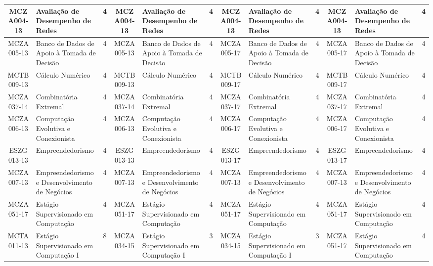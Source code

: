 \begin{landscape}
{\begin{longtable}{|c|p{.2\textheight}|c||c|p{.2\textheight}|c||c|p{.2\textheight}|c||c|p{.2\textheight}|c|}
MCZA004-13 & Avaliação de Desempenho de Redes & 4 &
MCZA004-13 & Avaliação de Desempenho de Redes & 4 &
MCZA004-13 & Avaliação de Desempenho de Redes & 4 &
MCZA004-13 & Avaliação de Desempenho de Redes & 4\\ \hline

MCZA005-13 & Banco de Dados de Apoio à Tomada de Decisão & 4 &
MCZA005-13 & Banco de Dados de Apoio à Tomada de Decisão & 4 &
MCZA005-17 & Banco de Dados de Apoio à Tomada de Decisão & 4 &
MCZA005-17 & Banco de Dados de Apoio à Tomada de Decisão & 4\\ \hline

MCTB009-13 & Cálculo Numérico & 4 &
MCTB009-13 & Cálculo Numérico & 4 &
MCTB009-17 & Cálculo Numérico & 4 &
MCTB009-17 & Cálculo Numérico & 4\\ \hline

MCZA037-14 & Combinatória Extremal & 4 &
MCZA037-14 & Combinatória Extremal & 4 &
MCZA037-17 & Combinatória Extremal & 4 &
MCZA037-17 & Combinatória Extremal & 4\\ \hline

MCZA006-13 & Computação Evolutiva e Conexionista & 4 &
MCZA006-13 & Computação Evolutiva e Conexionista & 4 &
MCZA006-17 & Computação Evolutiva e Conexionista & 4 &
MCZA006-17 & Computação Evolutiva e Conexionista & 4\\ \hline

ESZG013-13 & Empreendedorismo & 4 &
ESZG013-13 & Empreendedorismo & 4 &
ESZG013-17 & Empreendedorismo & 4 &
ESZG013-17 & Empreendedorismo & 4\\ \hline

MCZA007-13 & Empreendedorismo e Desenvolvimento de Negócios & 4 &
MCZA007-13 & Empreendedorismo e Desenvolvimento de Negócios & 4 &
MCZA007-13 & Empreendedorismo e Desenvolvimento de Negócios & 4 &
MCZA007-13 & Empreendedorismo e Desenvolvimento de Negócios & 4\\ \hline

MCZA051-17 & Estágio Supervisionado em Computação & 4 &
MCZA051-17 & Estágio Supervisionado em Computação & 4 &
MCZA051-17 & Estágio Supervisionado em Computação & 4 &
MCZA051-17 & Estágio Supervisionado em Computação & 4\\ \hline

MCTA011-13 & Estágio Supervisionado em Computação I& 8 &
MCZA034-15 & Estágio Supervisionado em Computação I & 3 &
MCZA034-15 & Estágio Supervisionado em Computação I & 3 &
MCZA051-17 & Estágio Supervisionado em Computação & 4\\ \hline


\end{longtable}}
\end{landscape}
